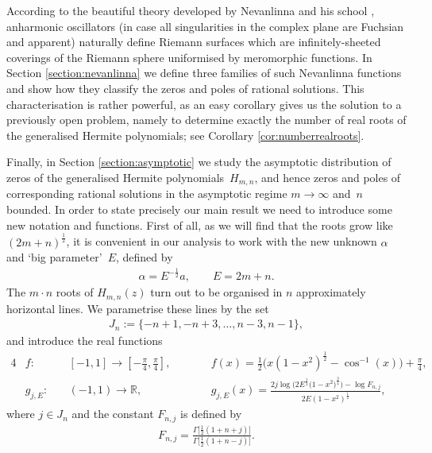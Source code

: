 \documentclass[pdftex]{sigma}
\numberwithin{equation}{section}
\newcommand{\bb}[1]{\mathbb{ #1 }}
\newcommand{\al}{\alpha}
\begin{document}
According to the beautiful theory developed by Nevanlinna and his school \cite{elfving1934, nevanlinna32}, anharmonic oscillators (in case all singularities in the complex plane are Fuchsian and apparent) naturally def\/ine Riemann surfaces which are inf\/initely-sheeted coverings of the Riemann sphere uniformised by meromorphic functions. In Section \ref{section:nevanlinna} we def\/ine three families of such Nevanlinna functions and show how they classify the zeros and poles of rational solutions. This characterisation is rather powerful, as an easy corollary gives us the solution to a previously open problem, namely
to determine exactly the number of real roots of the generalised Hermite polynomials; see Corollary \ref{cor:numberrealroots}.

Finally, in Section \ref{section:asymptotic} we study the asymptotic distribution of zeros of the generalised Hermite polynomials~$H_{m,n}$, and hence zeros and poles of corresponding rational solutions in the asymptotic regime $m \to \infty$ and~$n$ bounded. In order to state precisely our main result we need to introduce some new notation and functions. First of all, as we will f\/ind that the roots grow like $(2m+n)^{\frac12}$, it is convenient in our analysis to work with the new unknown $\al$ and `big parameter'~$E$, def\/ined by
\begin{gather}\label{eq:alE}
\al=E^{-\frac12}a,\qquad E=2m+n.
\end{gather}
The $m \cdot n $ roots of $H_{m,n}(z)$ turn out to be organised in $n$ approximately horizontal lines. We parametrise these lines by the set
\begin{gather*}%
J_n:=\lbrace -n+1,-n+3, \dots , n-3, n-1 \rbrace ,
\end{gather*}
and introduce the real functions
\begin{alignat*}{4}%
& f\colon \ && [-1,1] \to [-\tfrac{\pi}{4},\tfrac{\pi}{4}],\qquad && f(x)=\tfrac{1}{2}\big(x(1-x^2)^{\frac12}-\cos^{-1}(x)\big)+\frac{\pi}{4},& \\
& g_{j,E} \colon \ && (-1,1) \to \bb{R},\qquad && g_{j,E}(x) =
\frac{2 j \log \big(2E^{\frac12}\big(1-x^2\big)^{\frac34}\big)-\log F_{n,j}}{2 E (1-x^2)^{\frac12}},%
\end{alignat*}
where $j\in J_n$ and the constant $F_{n,j}$ is def\/ined by
\begin{gather}\label{eq:Fnj}
F_{n,j}=\frac{\Gamma\big[\tfrac{1}{2}(1+n+j)\big]}{\Gamma\big[\tfrac{1}{2}(1+n-j)\big]}.
\end{gather}
\end{document}
